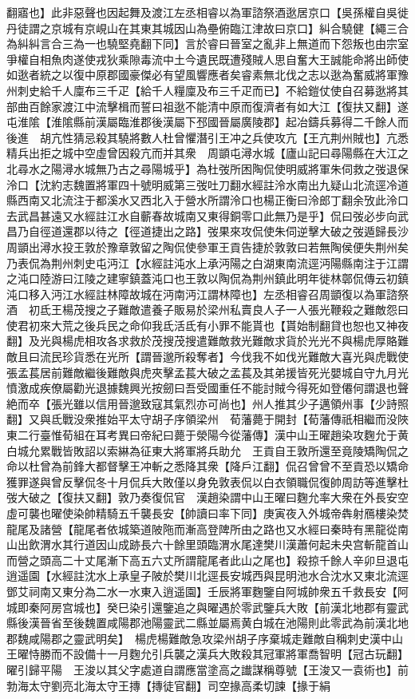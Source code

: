 翻寤也】此非惡聲也因起舞及渡江左丞相睿以為軍諮祭酒逖居京口【吳孫權自吳徙丹徒謂之京城有京峴山在其東其城因山為壘俯臨江津故曰京口】糾合驍健【繩三合為糾糾言合三為一也驍堅堯翻下同】言於睿曰晉室之亂非上無道而下怨叛也由宗室爭權自相魚肉遂使戎狄乘隙毒流中土今遺民既遭殘賊人思自奮大王誠能命將出師使如逖者統之以復中原郡國豪傑必有望風響應者矣睿素無北伐之志以逖為奮威將軍豫州刺史給千人廩布三千疋【給千人糧廩及布三千疋而已】不給鎧仗使自召募逖將其部曲百餘家渡江中流擊楫而誓曰祖逖不能清中原而復濟者有如大江【復扶又翻】遂屯淮隂【淮隂縣前漢屬臨淮郡後漢屬下邳國晉屬廣陵郡】起冶鑄兵募得二千餘人而後進　胡亢性猜忌殺其驍將數人杜曾懼潛引王冲之兵使攻亢【王亢荆州賊也】亢悉精兵出拒之城中空虛曾因殺亢而并其衆　周顗屯潯水城【廬山記曰尋陽縣在大江之北尋水之陽潯水城無乃古之尋陽城乎】為杜弢所困陶侃使明威將軍朱伺救之弢退保泠口【沈約志魏置將軍四十號明威第三弢吐刀翻水經註泠水南出九疑山北流逕冷道縣西南又北流注于都溪水又西北入于營水所謂泠口也楊正衡曰泠郎丁翻余攷此泠口去武昌甚遠又水經註江水自蘄春故城南又東得銅零口此無乃是乎】侃曰弢必步向武昌乃自徑道還郡以待之【徑道捷出之路】弢果來攻侃使朱伺逆擊大破之弢遁歸長沙周顗出潯水投王敦於豫章敦留之陶侃使參軍王貢告捷於敦敦曰若無陶侯便失荆州矣乃表侃為荆州刺史屯沔江【水經註沌水上承沔陽之白湖東南流逕沔陽縣南注于江謂之沌口陸游曰江陵之建寧鎮蓋沌口也王敦以陶侃為荆州鎮此明年徙林鄣侃傳云初鎮沌口移入沔江水經註林障故城在沔南沔江謂林障也】左丞相睿召周顗復以為軍諮祭酒　初氐王楊茂搜之子難敵遣養子販易於梁州私賣良人子一人張光鞭殺之難敵怨曰使君初來大荒之後兵民之命仰我氐活氐有小罪不能貰也【貰始制翻貸也恕也又神夜翻】及光與楊虎相攻各求救於茂搜茂搜遣難敵救光難敵求貨於光光不與楊虎厚賂難敵且曰流民珍貨悉在光所【謂晉邈所殺奪者】今伐我不如伐光難敵大喜光與虎戰使張孟萇居前難敵繼後難敵與虎夾擊孟萇大破之孟萇及其弟援皆死光嬰城自守九月光憤激成疾僚屬勸光退據魏興光按劒曰吾受國重任不能討賊今得死如登僊何謂退也聲絶而卒【張光雖以信用晉邈致寇其氣烈亦可尚也】州人推其少子邁領州事【少詩照翻】又與氐戰没衆推始平太守胡子序領梁州　荀藩薨于開封【荀藩傳祇相繼而没陜東二行臺惟荀組在耳考異曰帝紀曰薨于滎陽今從藩傳】漢中山王曜趙染攻麴允于黄白城允累戰皆敗詔以索綝為征東大將軍將兵助允　王貢自王敦所還至竟陵矯陶侃之命以杜曾為前鋒大都督擊王冲斬之悉降其衆【降戶江翻】侃召曾曾不至貢恐以矯命獲罪遂與曾反擊侃冬十月侃兵大敗僅以身免敦表侃以白衣領職侃復帥周訪等進擊杜弢大破之【復扶又翻】敦乃奏復侃官　漢趙染謂中山王曜曰麴允率大衆在外長安空虛可襲也曜使染帥精騎五千襲長安【帥讀曰率下同】庚寅夜入外城帝犇射鴈樓染焚龍尾及諸營【龍尾者依城築道陂陁而漸高登陴所由之路也又水經曰秦時有黑龍從南山出飲渭水其行道因山成跡長六十餘里頭臨渭水尾達樊川漢蕭何起未央宫斬龍首山而營之頭高二十丈尾漸下高五六丈所謂龍尾者此山之尾也】殺掠千餘人辛卯旦退屯逍遥園【水經註沈水上承皇子陂於樊川北逕長安城西與昆明池水合沈水又東北流逕鄧艾祠南又東分為二水一水東入逍遥園】壬辰將軍麴鑒自阿城帥衆五千救長安【阿城即秦阿房宫城也】癸巳染引還鑒追之與曜遇於零武鑒兵大敗【前漢北地郡有靈武縣後漢晉省至後魏置咸陽郡池陽靈武二縣並屬焉黄白城在池陽則此零武為前漢北地郡魏咸陽郡之靈武明矣】　楊虎楊難敵急攻梁州胡子序棄城走難敵自稱刺史漢中山王曜恃勝而不設備十一月麴允引兵襲之漢兵大敗殺其冠軍將軍喬智明【冠古玩翻】曜引歸平陽　王浚以其父字處道自謂應當塗高之䜟謀稱尊號【王浚又一袁術也】前勃海太守劉亮北海太守王摶【摶徒官翻】司空掾高柔切諫【掾于絹